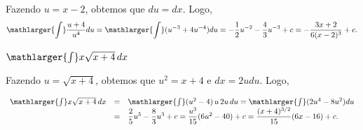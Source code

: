 \cleardoublepage\documentclass[../main.tex]{subfiles}
\begin{document}
\begin{exeresol}
\begin{compactenum}[a)]
  \begin{solution}
  Fazendo \(u=x-2\), obtemos que \(du=dx\). Logo,
\[ \mathlarger{\int} \dfrac{u+4}{u^4}du= \mathlarger{\int} (u^{-3}+4u^{-4})du=-\dfrac{1}{2}u^{-2}-\dfrac{4}{3}u^{-3}+c = -\dfrac{3x+2}{6(x-2)^3}+c. \]
  \end{solution}
  \item \( \mathlarger{\int} x\sqrt{x+4}\,dx\)
  
  \begin{solution}
  Fazendo \(u=\sqrt{x+4}\), obtemos que \(u^2=x+4\) e \(dx=2u du\). Logo,

\[ \begin{array}{rcl} \mathlarger{\int} x\sqrt{x+4}\,dx &=& \mathlarger{\int}(u^2-4)\,u\,2u\, du = \mathlarger{\int}(2u^4-8u^2)du\\ &=&\dfrac{2}{5}u^5-\dfrac{8}{3}u^3 +c =\dfrac{u^3}{15}(6u^2-40)+c =\dfrac{(x+4)^{3/2}}{15}(6x-16)+c. \end{array} \]
  \end{solution}
  \end{compactenum}
 \end{exeresol}
\end{document}
